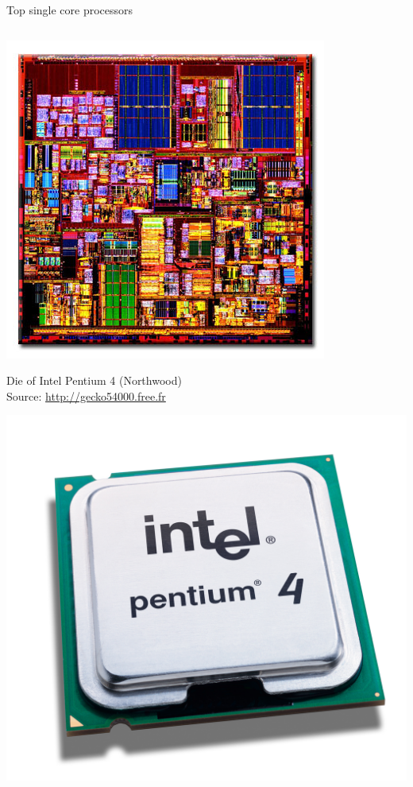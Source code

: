 \begin{frame}[t,shrink=15]{Top single core processors}
\begin{columns}
  \begin{column}{.15\textwidth}
    \includegraphics[width=\textwidth]{images/intel-p4-die.jpg}\\
    \begin{tiny}
      Die of Intel Pentium 4 (Northwood)\\ 
      Source: \url{http://gecko54000.free.fr}\\
    \end{tiny}
    \vspace{0.75em}
    \begin{center}
      \includegraphics[width=.9\textwidth]{images/intel-p4.jpg}\\

\end{center}
\end{column}
\end{columns}
\end{frame}
